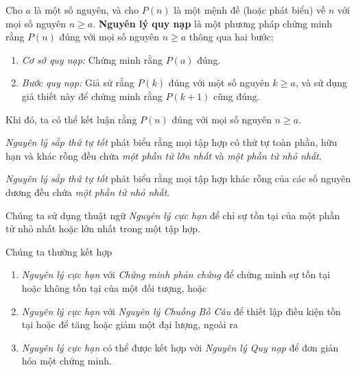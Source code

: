 \documentclass[../imo-training-open-book.tex]{subfiles}
\begin{document}
\begin{theorem*}
    \label{theorem:induction-principle}
    Cho \( a \) là một số nguyên, và cho \( P(n) \) là một mệnh đề (hoặc phát biểu) về \( n \) với mọi số nguyên \( n \geq a \).
    \textbf{Nguyên lý quy nạp} là một phương pháp chứng minh rằng \( P(n) \) đúng với mọi số nguyên \( n \geq a \) thông qua hai bước:
    \begin{enumerate}[topsep=0pt, partopsep=0pt, itemsep=0pt]
        \item \textit{Cơ sở quy nạp:} Chứng minh rằng \( P(a) \) đúng.
        \item \textit{Bước quy nạp:} Giả sử rằng \( P(k) \) đúng với một số nguyên \( k \geq a \),
        và sử dụng giả thiết này để chứng minh rằng \( P(k+1) \) cũng đúng.
    \end{enumerate}
    Khi đó, ta có thể kết luận rằng \( P(n) \) đúng với mọi số nguyên \( n \geq a \).
\end{theorem*}

\begin{theorem*}
    \label{theorem:well-ordering-principle-on-finite-set}
    \textit{Nguyên lý sắp thứ tự tốt} phát biểu rằng mọi tập hợp có thứ tự toàn phần,
    hữu hạn và khác rỗng đều chứa \textit{một phần tử lớn nhất} và \textit{một phần tử nhỏ nhất}.
\end{theorem*}

\begin{theorem*}
    \label{theorem:well-ordering-principle}
    \textit{Nguyên lý sắp thứ tự tốt} phát biểu rằng mọi tập hợp khác rỗng của các số nguyên dương đều chứa \textit{một phần tử nhỏ nhất}.
\end{theorem*}

\begin{theorem*}
    \label{theorem:extremal-principle}
    Chúng ta sử dụng thuật ngữ \textit{Nguyên lý cực hạn} để chỉ sự tồn tại của một phần tử nhỏ nhất hoặc lớn nhất trong một tập hợp.

    Chúng ta thường kết hợp
    \begin{enumerate}[topsep=0pt, partopsep=0pt, itemsep=0pt]
        \item \textit{Nguyên lý cực hạn} với \textit{Chứng minh phản chứng} để chứng minh sự tồn tại hoặc không tồn tại của một đối tượng, hoặc
        \item \textit{Nguyên lý cực hạn} với \textit{Nguyên lý Chuồng Bồ Câu} để thiết lập điều kiện tồn tại hoặc để tăng hoặc giảm một đại lượng, ngoài ra
        \item \textit{Nguyên lý cực hạn} có thể được kết hợp với \textit{Nguyên lý Quy nạp} để đơn giản hóa một chứng minh.  
    \end{enumerate}
\end{theorem*}
\end{document}
